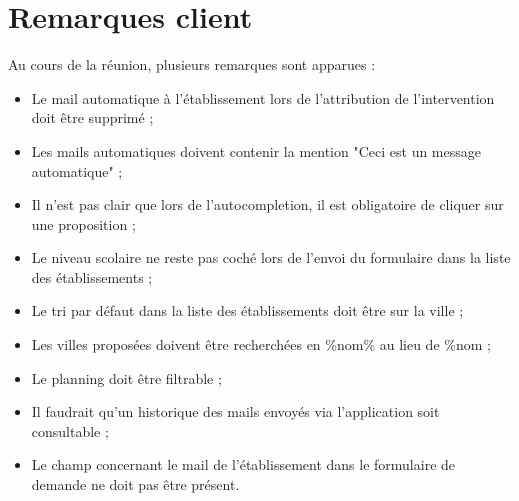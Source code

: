 \documentclass [a4paper] {article}
\begin{document}
\section{Remarques client}
Au cours de la réunion, plusieurs remarques sont apparues  : 
\begin{itemize}
	\item Le mail automatique à l'établissement lors de l'attribution de l'intervention doit être supprimé ;
	\item Les mails automatiques doivent contenir la mention "Ceci est un message automatique" ;
	\item Il n'est pas clair que lors de l'autocompletion, il est obligatoire de cliquer sur une proposition ;
	\item Le niveau scolaire ne reste pas coché lors de l'envoi du formulaire dans la liste des établissements ;
	\item Le tri par défaut dans la liste des établissements doit être sur la ville ;
	\item Les villes proposées doivent être recherchées en \%nom\% au lieu de \%nom ;
	\item Le planning doit être filtrable ;
	\item Il faudrait qu'un historique des mails envoyés via l'application soit consultable ;
	\item Le champ concernant le mail de l'établissement dans le formulaire de demande ne doit pas être présent.
\end{itemize}

\newpage
\end{document}

